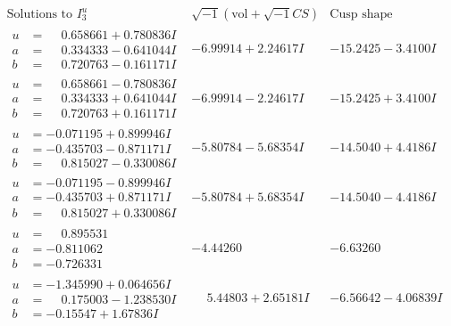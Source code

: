\documentclass[1p]{elsarticle_modified}
\theoremstyle{definition}
\newcommand{\I}{\sqrt{-1}}
\begin{document}
$$\begin{array}{c|c|c}  
\text{Solutions to }I^u_{3}& \I (\text{vol} + \sqrt{-1}CS) & \text{Cusp shape}\\
 \hline 
\begin{aligned}
u &= \phantom{-}0.658661 + 0.780836 I \\
a &= \phantom{-}0.334333 - 0.641044 I \\
b &= \phantom{-}0.720763 - 0.161171 I\end{aligned}
 & -6.99914 + 2.24617 I & -15.2425 - 3.4100 I \\ \hline\begin{aligned}
u &= \phantom{-}0.658661 - 0.780836 I \\
a &= \phantom{-}0.334333 + 0.641044 I \\
b &= \phantom{-}0.720763 + 0.161171 I\end{aligned}
 & -6.99914 - 2.24617 I & -15.2425 + 3.4100 I \\ \hline\begin{aligned}
u &= -0.071195 + 0.899946 I \\
a &= -0.435703 - 0.871171 I \\
b &= \phantom{-}0.815027 - 0.330086 I\end{aligned}
 & -5.80784 - 5.68354 I & -14.5040 + 4.4186 I \\ \hline\begin{aligned}
u &= -0.071195 - 0.899946 I \\
a &= -0.435703 + 0.871171 I \\
b &= \phantom{-}0.815027 + 0.330086 I\end{aligned}
 & -5.80784 + 5.68354 I & -14.5040 - 4.4186 I \\ \hline\begin{aligned}
u &= \phantom{-}0.895531\phantom{ +0.000000I} \\
a &= -0.811062\phantom{ +0.000000I} \\
b &= -0.726331\phantom{ +0.000000I}\end{aligned}
 & -4.44260\phantom{ +0.000000I} & -6.63260\phantom{ +0.000000I} \\ \hline\begin{aligned}
u &= -1.345990 + 0.064656 I \\
a &= \phantom{-}0.175003 - 1.238530 I \\
b &= -0.15547 + 1.67836 I\end{aligned}
 & \phantom{-}5.44803 + 2.65181 I & -6.56642 - 4.06839 I \\ \hline\begin{aligned}

\end{aligned}
\end{array}$$
\end{document}
